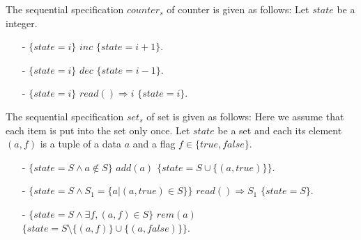 \begin{example}[Counter]
\label{definition:sequential specification of counter}
The sequential specification $\mathit{counter}_s$ of counter is given as follows: Let $\mathit{state}$ be a integer.

\begin{itemize}
\setlength{\itemsep}{0.5pt}
\item[-] $\{ \mathit{state} = i \}$ $\mathit{inc}$ $\{ \mathit{state} = i+1 \}$.
\item[-] $\{ \mathit{state} = i \}$ $\mathit{dec}$ $\{ \mathit{state} = i-1 \}$.
\item[-] $\{ \mathit{state} = i \}$ $\mathit{read}() \Rightarrow i$ $\{ \mathit{state} = i \}$.
\end{itemize}
\end{example}


\begin{example}[Set]
\label{definition:sequential specification of set}
The sequential specification $\mathit{set}_s$ of set is given as follows: Here we assume that each item is put into the set only once. Let $\mathit{state}$ be a set and each its element $(a,f)$ is a tuple of a data $a$ and a flag $f \in \{ \mathit{true},\mathit{false} \}$.

\begin{itemize}
\setlength{\itemsep}{0.5pt}
\item[-] $\{ \mathit{state} = S \wedge a \notin S \}$ $\mathit{add}(a)$ $\{ \mathit{state} = S \cup \{ (a,\mathit{true}) \} \}$.
\item[-] $\{ \mathit{state} = S \wedge S_1 = \{a \vert (a,\mathit{true}) \in S \} \}$ $\mathit{read}() \Rightarrow S_1$ $\{ \mathit{state} = S \}$.
\item[-] $\{ \mathit{state} = S \wedge \exists f, (a,f) \in S \}$ $\mathit{rem}(a)$ $\{ \mathit{state} = S \setminus \{ (a,f) \} \cup \{ (a,\mathit{false}) \} \}$.
\end{itemize}
\end{example}



